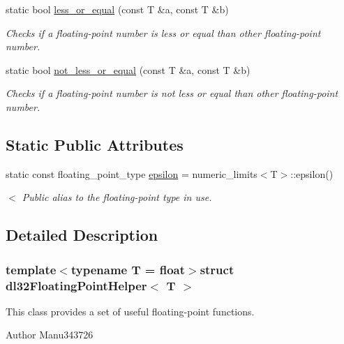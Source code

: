 \begin{DoxyCompactItemize}
static bool \hyperlink{structdl32_floating_point_helper_a82b58cc6bc6b72b8e8f2c8727f7e1c46}{less\-\_\-or\-\_\-equal} (const T \&a, const T \&b)
\begin{DoxyCompactList}\small\item\em Checks if a floating-\/point number is less or equal than other floating-\/point number. \end{DoxyCompactList}\item 
static bool \hyperlink{structdl32_floating_point_helper_a29a21fc10d7aeabeb7f01218ba1acde8}{not\-\_\-less\-\_\-or\-\_\-equal} (const T \&a, const T \&b)
\begin{DoxyCompactList}\small\item\em Checks if a floating-\/point number is not less or equal than other floating-\/point number. \end{DoxyCompactList}\end{DoxyCompactItemize}
\subsection*{Static Public Attributes}
\begin{DoxyCompactItemize}
\item 
static const floating\-\_\-point\-\_\-type \hyperlink{structdl32_floating_point_helper_a90f2525eb7cd225454fc3854b54fc71c}{epsilon} = numeric\-\_\-limits$<$T$>$\-::epsilon()
\begin{DoxyCompactList}\small\item\em $<$ Public alias to the floating-\/point type in use. \end{DoxyCompactList}\end{DoxyCompactItemize}


\subsection{Detailed Description}
\subsubsection*{template$<$typename T = float$>$struct dl32\-Floating\-Point\-Helper$<$ T $>$}

This class provides a set of useful floating-\/point functions. 

\begin{DoxyAuthor}{Author}
Manu343726 
\end{DoxyAuthor}


